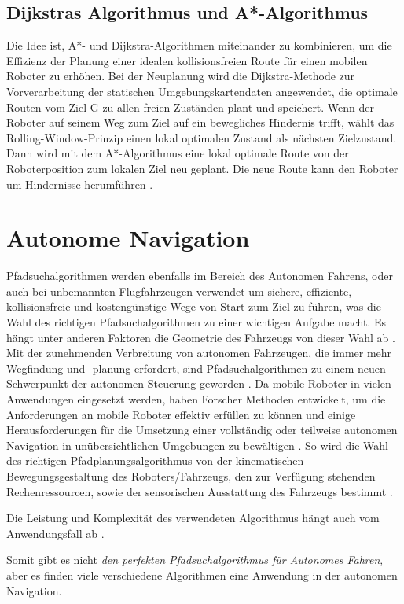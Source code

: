 \subsection{Dijkstras Algorithmus und A*-Algorithmus}

Die Idee ist, A*- und Dijkstra-Algorithmen miteinander zu kombinieren, um die Effizienz der Planung einer idealen kollisionsfreien Route für einen mobilen Roboter zu erhöhen. Bei der Neuplanung wird die Dijkstra-Methode zur Vorverarbeitung der statischen Umgebungskartendaten angewendet, die optimale Routen vom Ziel G zu allen freien Zuständen plant und speichert. Wenn der Roboter auf seinem Weg zum Ziel auf ein bewegliches Hindernis trifft, wählt das Rolling-Window-Prinzip einen lokal optimalen Zustand als nächsten Zielzustand. Dann wird mit dem A*-Algorithmus eine lokal optimale Route von der Roboterposition zum lokalen Ziel neu geplant.
Die neue Route kann den Roboter um Hindernisse herumführen \cite{Hong-mei17}.



\section{Autonome Navigation}
\label{Autonome Navigation}

Pfadsuchalgorithmen werden ebenfalls im Bereich des Autonomen Fahrens, oder auch bei unbemannten Flugfahrzeugen verwendet
um sichere, effiziente, kollisionsfreie und kostengünstige Wege von Start zum Ziel zu führen, was die Wahl des richtigen Pfadsuchalgorithmen
zu einer wichtigen Aufgabe macht. Es hängt unter anderen Faktoren die Geometrie des Fahrzeugs von dieser Wahl ab \cite{Karur:21}.
Mit der zunehmenden Verbreitung von autonomen Fahrzeugen, die immer mehr Wegfindung und -planung erfordert, sind Pfadsuchalgorithmen
zu einem neuen Schwerpunkt der autonomen Steuerung geworden \cite{Karur:21}.
Da mobile Roboter in vielen Anwendungen eingesetzt werden, haben Forscher Methoden entwickelt, um die 
Anforderungen an mobile Roboter effektiv erfüllen zu können und einige Herausforderungen für die Umsetzung einer vollständig oder
teilweise autonomen Navigation in unübersichtlichen Umgebungen zu bewältigen \cite{Karur:21}.
So wird die Wahl des richtigen Pfadplanungsalgorithmus von der kinematischen Bewegungsgestaltung des Roboters/Fahrzeugs,
den zur Verfügung stehenden Rechenressourcen, sowie der sensorischen Ausstattung des Fahrzeugs bestimmt \cite{Karur:21}.

Die Leistung und Komplexität des verwendeten Algorithmus hängt auch vom Anwendungsfall ab \cite{Karur:21}.

Somit gibt es nicht \emph{den perfekten Pfadsuchalgorithmus für Autonomes Fahren}, aber es finden viele verschiedene Algorithmen eine 
Anwendung in der autonomen Navigation.